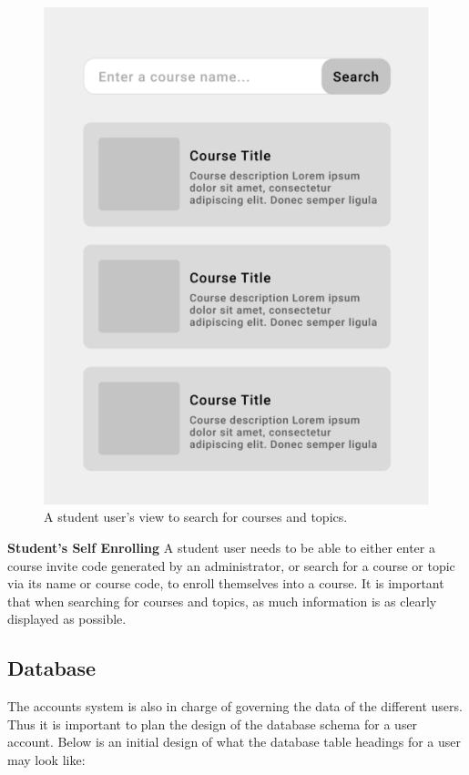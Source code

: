 \begin{figure}[h!]
  \centering
  \includegraphics[scale=0.4]{images/accounts-search}
  \caption{A student user's view to search for courses and topics.}
\end{figure}

\textbf{Student's Self Enrolling}
A student user needs to be able to either enter a course invite code generated by an administrator, or search for a course or topic via its name or course code, to enroll themselves into a course. It is important that when searching for courses and topics, as much information is as clearly displayed as possible.

\subsection{Database}
The accounts system is also in charge of governing the data of the different users. Thus it is important to plan the design of the database schema for a user account. Below is an initial design of what the database table headings for a user may look like:

